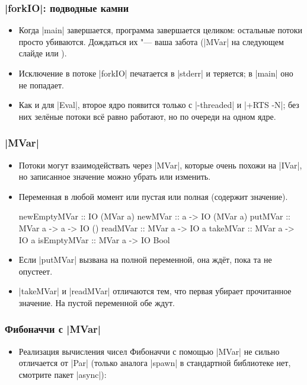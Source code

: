 \documentclass[11pt]{beamer}
\begin{document}
\begin{frame}[fragile]
  \frametitle{\haskinline|forkIO|: подводные камни}
  \begin{itemize}
    \item Когда \haskinline|main| завершается, программа завершается целиком: остальные потоки просто убиваются. Дождаться их "--- ваша забота (\haskinline|MVar| на следующем слайде или ).
    \item Исключение в потоке \haskinline|forkIO| печатается в \haskinline|stderr| и теряется; в \haskinline|main| оно не попадает.
    \item Как и для \haskinline|Eval|, второе ядро появится только с \ghcinline|-threaded| и \ghcinline|+RTS -N|; без них зелёные потоки всё равно работают, но по очереди на одном ядре.
  \end{itemize}
\end{frame}

\begin{frame}[fragile]
  \frametitle{\haskinline|MVar|}
  \begin{itemize}
    \item Потоки могут взаимодействать через \haskinline|MVar|, которые очень похожи на \haskinline|IVar|, но записанное значение можно убрать или изменить.
    \item Переменная в любой момент или пустая или полная (содержит значение).
          \begin{haskellsmall}
            newEmptyMVar :: IO (MVar a)
            newMVar :: a -> IO (MVar a)
            putMVar :: MVar a -> a -> IO ()
            readMVar :: MVar a -> IO a
            takeMVar :: MVar a -> IO a
            isEmptyMVar :: MVar a -> IO Bool
          \end{haskellsmall}
    \item Если \haskinline|putMVar| вызвана на полной переменной, она ждёт, пока та не опустеет.
    \item \haskinline|takeMVar| и \haskinline|readMVar| отличаются тем, что первая убирает прочитанное значение. На пустой переменной обе ждут.
  \end{itemize}
\end{frame}

\begin{frame}[fragile]
  \frametitle{Фибоначчи с \haskinline|MVar|}
  \begin{itemize}
    \item Реализация вычисления чисел Фибоначчи с помощью \haskinline|MVar| не сильно отличается от \haskinline|Par| (только аналога \haskinline|spawn| в стандартной библиотеке нет, смотрите пакет \haskinline|async|):
  \end{itemize}
\end{frame}
\end{document}
